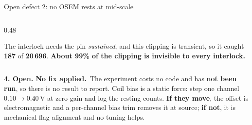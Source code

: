 \documentclass[aspectratio=169]{beamer}
\newcommand{\stillopen}{\textbf{4. Open. No fix applied.}}
\begin{document}
\begin{frame}{Open defect 2: no OSEM rests at mid-scale}
\begin{columns}[T]
\begin{column}{0.48\textwidth}
      \vspace{1.5mm}
      \raggedright
      The interlock needs the pin \emph{sustained}, and this clipping is
      transient, so it caught \textbf{187} of \textbf{20\,696}.
      \alert{\textbf{About 99\% of the clipping is invisible to every
      interlock.}}
    \end{column}
  \end{columns}

  \vspace{1.5mm}
  \stillopen\ The experiment costs no code and has \textbf{not been run}, so
  there is no result to report. Coil bias is a static force: step one channel
  $0.10 \to 0.40$\,V at zero gain and log the resting counts. \textbf{If they
  move}, the offset is electromagnetic and a per-channel bias trim removes it at
  source; \textbf{if not}, it is mechanical flag alignment and no tuning helps.
\end{frame}
\end{document}
